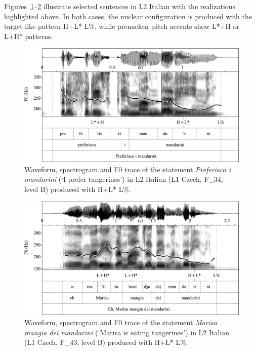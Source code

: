 Figures~\ref{fig:4.18}--\ref{fig:4.19} illustrate selected sentences in L2 Italian with the realizations highlighted above. In both cases, the nuclear configuration is produced with the target-like pattern H+L* L\%, while prenuclear pitch accents show L*+H or L+H* patterns.

\begin{figure}


\includegraphics[width=\textwidth]{figures/Figure_4.18.png}


\caption{Waveform, spectrogram and F0 trace of the statement \textit{Preferisco i mandarini} (‘I prefer tangerines’) in L2 Italian (L1 Czech, \mbox{F\_34}, level B) produced with H+L* L\%.}
\label{fig:4.18}
\end{figure}

\begin{figure}


\includegraphics[width=\textwidth]{figures/Figure_4.19.png}

\caption{Waveform, spectrogram and F0 trace of the statement \textit{Marisa mangia dei mandarini} (‘Marisa is eating tangerines’) in L2 Italian (L1 Czech, \mbox{F\_43}, level B) produced with H+L* L\%.}
\label{fig:4.19}
\end{figure}

